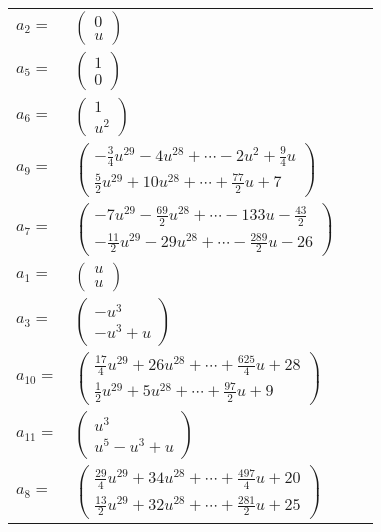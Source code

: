 \documentclass[1p]{elsarticle_modified}
\theoremstyle{definition}
\begin{document}
\begin{tabular}{m{7pt} m{180pt} m{7pt} m{180pt} }
\flushright $a_{2}=$&$\begin{pmatrix}0\\u\end{pmatrix}$ \\
\flushright $a_{5}=$&$\begin{pmatrix}1\\0\end{pmatrix}$ \\
\flushright $a_{6}=$&$\begin{pmatrix}1\\u^2\end{pmatrix}$ \\
\flushright $a_{9}=$&$\begin{pmatrix}-\frac{3}{4} u^{29}-4 u^{28}+\cdots-2 u^2+\frac{9}{4} u\\\frac{5}{2} u^{29}+10 u^{28}+\cdots+\frac{77}{2} u+7\end{pmatrix}$ \\
\flushright $a_{7}=$&$\begin{pmatrix}-7 u^{29}-\frac{69}{2} u^{28}+\cdots-133 u-\frac{43}{2}\\-\frac{11}{2} u^{29}-29 u^{28}+\cdots-\frac{289}{2} u-26\end{pmatrix}$ \\
\flushright $a_{1}=$&$\begin{pmatrix}u\\u\end{pmatrix}$ \\
\flushright $a_{3}=$&$\begin{pmatrix}- u^3\\- u^3+u\end{pmatrix}$ \\
\flushright $a_{10}=$&$\begin{pmatrix}\frac{17}{4} u^{29}+26 u^{28}+\cdots+\frac{625}{4} u+28\\\frac{1}{2} u^{29}+5 u^{28}+\cdots+\frac{97}{2} u+9\end{pmatrix}$ \\
\flushright $a_{11}=$&$\begin{pmatrix}u^3\\u^5- u^3+u\end{pmatrix}$ \\
\flushright $a_{8}=$&$\begin{pmatrix}\frac{29}{4} u^{29}+34 u^{28}+\cdots+\frac{497}{4} u+20\\\frac{13}{2} u^{29}+32 u^{28}+\cdots+\frac{281}{2} u+25\end{pmatrix}$ \\

\end{tabular}
\end{document}
